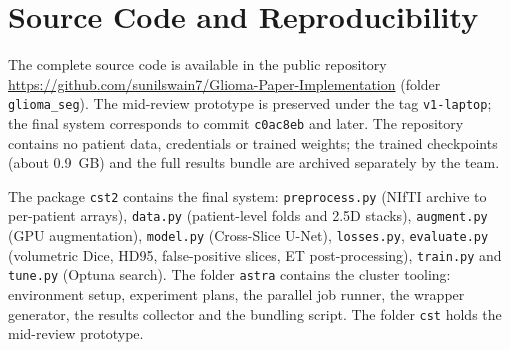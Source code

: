 \clearpage
\appendix\chapter{Source Code and Reproducibility}
\sloppy
The complete source code is available in the public repository \url{https://github.com/sunilswain7/Glioma-Paper-Implementation} (folder \texttt{glioma\_seg}). The mid-review prototype is preserved under the tag \texttt{v1-laptop}; the final system corresponds to commit \texttt{c0ac8eb} and later. The repository contains no patient data, credentials or trained weights; the trained checkpoints (about 0.9~GB) and the full results bundle are archived separately by the team.

The package \texttt{cst2} contains the final system: \texttt{preprocess.py} (NIfTI archive to per-patient arrays), \texttt{data.py} (patient-level folds and 2.5D stacks), \texttt{augment.py} (GPU augmentation), \texttt{model.py} (Cross-Slice U-Net), \texttt{losses.py}, \texttt{evaluate.py} (volumetric Dice, HD95, false-positive slices, ET post-processing), \texttt{train.py} and \texttt{tune.py} (Optuna search). The folder \texttt{astra} contains the cluster tooling: environment setup, experiment plans, the parallel job runner, the wrapper generator, the results collector and the bundling script. The folder \texttt{cst} holds the mid-review prototype.

